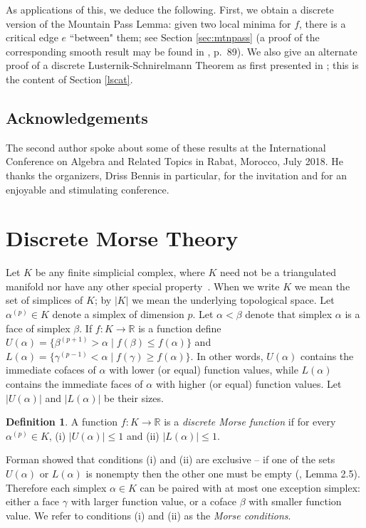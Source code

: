 \documentclass[11pt]{amsart}
\theoremstyle{definition}
\newtheorem{definition}[theorem]{Definition}
\newcommand{\Rspace}{{\mathbb R}}
\begin{document}
As applications of this, we deduce the following. First, we obtain a discrete version of the Mountain Pass Lemma: given two local minima for $f$, there is a critical edge $e$ ``between" them; see Section \ref{sec:mtnpass} (a proof of the corresponding smooth result may be found in \cite{nico}, p.~89). We also give an alternate proof of a discrete Lusternik-Schnirelmann Theorem as first presented in \cite{scoville}; this is the content of Section \ref{lscat}.

\subsection*{Acknowledgements} The second author spoke about some of these results at the International Conference on Algebra and Related Topics in Rabat, Morocco, July 2018. He thanks the organizers, Driss Bennis in particular, for the invitation and for an enjoyable and stimulating conference.


\section{Discrete Morse Theory}\label{dmt}

Let $K$ be any finite simplicial complex, where $K$ need not be a triangulated manifold nor have any other special property~\cite{forman}. When we write $K$ we mean the set of simplices of $K$; by $|K|$ we mean the underlying topological space. 
Let $\alpha^{(p)} \in K$ denote a simplex of dimension $p$. 
Let $\alpha < \beta$ denote that simplex $\alpha$ is a face of simplex $\beta$. If $f:K\to \Rspace$ is a function
define $U(\alpha) = \{\beta^{(p+1)} > \alpha \mid f(\beta) \leq f(\alpha) \}$ 
and $L(\alpha) = \{\gamma^{(p-1)} < \alpha \mid f(\gamma) \geq f(\alpha) \}$.
In other words, $U(\alpha)$ contains the immediate cofaces of $\alpha$ with lower (or equal) function values, while $L(\alpha)$ contains the immediate  faces of $\alpha$ with higher (or equal) function values. 
Let $|U(\alpha)|$ and $|L(\alpha)|$ be their sizes.  

\begin{definition}
A function $f: K \to \Rspace$ is a \emph{discrete Morse function} if for every $\alpha^{(p)} \in K$, 
(i) $|U(\alpha)| \leq 1$ and 
(ii) $|L(\alpha)| \leq 1$.
\end{definition}

Forman showed that conditions (i) and (ii) are exclusive -- if one of the sets $U(\alpha)$ or $L(\alpha)$ is nonempty then the other one must be empty (\cite{forman}, Lemma 2.5).
Therefore each simplex $\alpha \in K$ can be paired with at most one exception simplex: either a face $\gamma$ with larger function value, or a coface $\beta$ with smaller function value. 
We refer to conditions (i) and (ii) as the \emph{Morse conditions}. 
\end{document}
